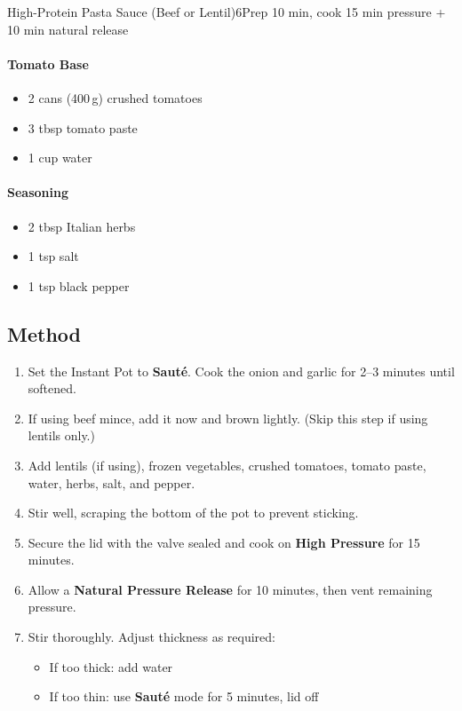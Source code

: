 \begin{recipebox}{High-Protein Pasta Sauce (Beef or Lentil)}{6}{Prep 10 min, cook 15 min pressure + 10 min natural release}
\paragraph{Tomato Base}
\begin{itemize}
    \item 2 cans (400\,g) crushed tomatoes
    \item 3 tbsp tomato paste
    \item 1 cup water
\end{itemize}

\paragraph{Seasoning}
\begin{itemize}
    \item 2 tbsp Italian herbs
    \item 1 tsp salt
    \item 1 tsp black pepper
\end{itemize}

\subsection*{Method}
\begin{enumerate}
    \item Set the Instant Pot to \textbf{Sauté}. Cook the onion and garlic for 2--3 minutes until softened.
    \item If using beef mince, add it now and brown lightly. (Skip this step if using lentils only.)
    \item Add lentils (if using), frozen vegetables, crushed tomatoes, tomato paste, water, herbs, salt, and pepper.
    \item Stir well, scraping the bottom of the pot to prevent sticking.
    \item Secure the lid with the valve sealed and cook on \textbf{High Pressure} for 15 minutes.
    \item Allow a \textbf{Natural Pressure Release} for 10 minutes, then vent remaining pressure.
    \item Stir thoroughly. Adjust thickness as required:
    \begin{itemize}
        \item If too thick: add water
        \item If too thin: use \textbf{Sauté} mode for 5 minutes, lid off
    \end{itemize}
\end{enumerate}


\end{recipebox}
